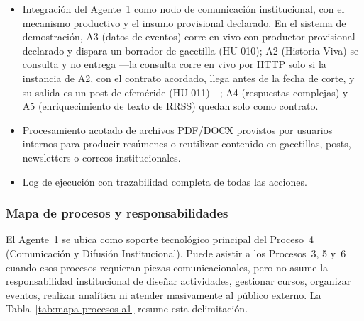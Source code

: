 \documentclass[a4paper, 12pt]{article}
\begin{document}
\begin{itemize}
  \item Integraci\'on del Agente~1 como nodo de comunicaci\'on institucional, con el mecanismo productivo y el insumo provisional declarado. En el sistema de demostraci\'on, A3 (datos de eventos) corre en vivo con productor provisional declarado y dispara un borrador de gacetilla (HU-010); A2 (Historia Viva) se consulta y no entrega ---la consulta corre en vivo por HTTP solo si la instancia de A2, con el contrato acordado, llega antes de la fecha de corte, y su salida es un post de efem\'eride (HU-011)---; A4 (respuestas complejas) y A5 (enriquecimiento de texto de \ac{RRSS}) quedan solo como contrato.
  \item Procesamiento acotado de archivos PDF/DOCX provistos por usuarios internos para producir res\'umenes o reutilizar contenido en gacetillas, posts, newsletters o correos institucionales.
  \item Log de ejecuci\'on con trazabilidad completa de todas las acciones.
\end{itemize}

\subsubsection{Mapa de procesos y responsabilidades}

El Agente~1 se ubica como soporte tecnol\'ogico principal del Proceso~4 (Comunicaci\'on y Difusi\'on Institucional). Puede asistir a los Procesos~3, 5 y~6 cuando esos procesos requieran piezas comunicacionales, pero no asume la responsabilidad institucional de dise\~nar actividades, gestionar cursos, organizar eventos, realizar anal\'itica ni atender masivamente al p\'ublico externo. La Tabla~\ref{tab:mapa-procesos-a1} resume esta delimitaci\'on.
\end{document}
